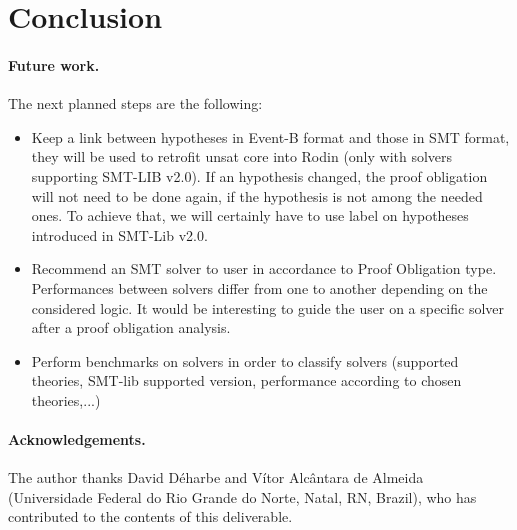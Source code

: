 \documentclass[10pt,a4paper]{report}
\begin{document}





\section{Conclusion}

\paragraph{Future work.} 
The next planned steps are the following:
\begin{itemize}
\item Keep a link between hypotheses in Event-B format and those in SMT format, they will be used to retrofit unsat core into Rodin (only with solvers supporting SMT-LIB v2.0). If an hypothesis changed, the proof obligation will not need to be done again, if the hypothesis is not among the needed ones. To achieve that, we will certainly have to use label on hypotheses introduced in SMT-Lib v2.0.
\item Recommend an SMT solver to user in accordance to Proof Obligation type. Performances 
between solvers differ from one to another depending on the considered logic. It would be interesting to 
guide the user on a specific solver after a proof obligation analysis.  
\item Perform benchmarks on solvers in order to classify solvers (supported theories, SMT-lib supported version, performance according to chosen theories,...)

\end{itemize}

\paragraph{Acknowledgements.} 
The author thanks David D\'eharbe and V\'itor Alc\^antara de Almeida (Universidade Federal do Rio Grande do Norte, Natal, RN, Brazil), who has contributed to the contents of this deliverable.

\nocite{*}



\appendix
\makeatletter
\def\@seccntformat#1{Appendix~\csname the#1\endcsname:\quad}
\makeatother


     
\end{document}
